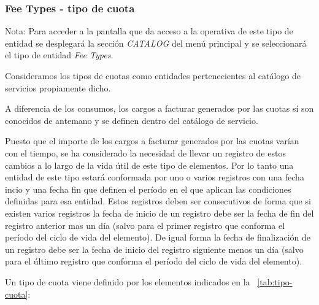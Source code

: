 \subsubsection{Fee Types - tipo de cuota}
\label{sub:fee-type}

Nota: Para acceder a la pantalla que da acceso a la operativa de este tipo de entidad se desplegará la sección \emph{CATALOG} del menú principal y se seleccionará el tipo de entidad \emph{Fee Types}.

Consideramos los tipos de cuotas como entidades pertenecientes al catálogo de servicios propiamente dicho.

A diferencia de los consumos, los cargos a facturar generados por las cuotas sí son conocidos de antemano y se definen dentro del catálogo de servicio.

Puesto que el importe de los cargos a facturar generados por las cuotas varían con el tiempo, se ha considerado la necesidad de llevar un registro de estos cambios a lo largo de la vida útil de este tipo de elementos. Por lo tanto una entidad de este tipo estará conformada por uno o varios registros con una fecha incio y una fecha fin que definen el período en el que aplican las condiciones definidas para esa entidad. Estos registros deben ser consecutivos de forma que si existen varios registros la fecha de inicio de un registro debe ser la fecha de fin del registro anterior mas un día (salvo para el primer registro que conforma el período del ciclo de vida del elemento). De igual forma la fecha de finalización de un registro debe ser la fecha de inicio del registro siguiente menos un día (salvo para el último registro que conforma el período del ciclo de vida del elemento).


Un tipo de cuota viene definido por los elementos indicados en la \tablename~\ref{tab:tipo-cuota}:




